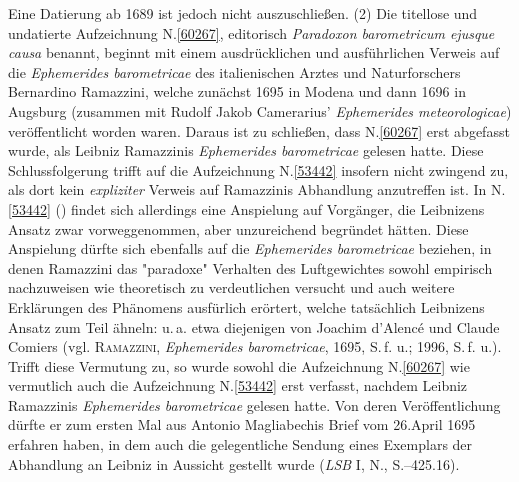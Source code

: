 Eine Datierung ab 1689 ist jedoch nicht auszuschließen.
\pend%
\pstart%
(2)
Die titellose und undatierte Aufzeichnung N.\;\ref{60267}, editorisch \textit{Paradoxon barometricum ejusque causa} benannt, beginnt mit einem ausdrücklichen und ausführlichen Verweis auf die \textit{Ephemerides barometricae} des italienischen Arztes und Naturforschers Bernardino Ramazzini, welche zunächst 1695\cite{01516} in Modena und dann 1696\cite{01517} in Augsburg (zusammen mit Rudolf Jakob Camerarius' \textit{Ephemerides meteorologicae})\cite{01445} veröffentlicht worden waren.
Daraus ist zu schließen, dass N.\;\ref{60267} erst abgefasst wurde, als Leibniz Ramazzinis \textit{Ephemerides barometricae}\cite{01516} gelesen hatte.
Diese Schlussfolgerung trifft auf die Aufzeichnung N.\;\ref{53442} insofern nicht zwingend zu, als dort kein \textit{expliziter} Verweis auf Ramazzinis Abhandlung anzutreffen ist.
In N.\;\ref{53442} () findet sich allerdings eine Anspielung auf Vorgänger, die Leibnizens Ansatz zwar vorweggenommen, aber unzureichend begründet hätten.
Diese Anspielung dürfte sich ebenfalls auf die \textit{Ephemerides barometricae} beziehen, in denen Ramazzini das "paradoxe" Verhalten des Luftgewichtes sowohl empirisch nachzuweisen wie theoretisch zu verdeutlichen versucht und auch weitere Erklärungen des Phänomens ausfürlich erörtert, welche tatsächlich Leibnizens Ansatz zum Teil ähneln: u.\,a. etwa diejenigen von Joachim d'Alencé und Claude Comiers (vgl. \textsc{Ramazzini}, \textit{Ephemerides barometricae}, 1695,\cite{01516} S.\,f. u.; 1996,\cite{01517} S.\,f. u.).
Trifft diese Vermutung zu, so %
wurde sowohl die Aufzeichnung N.\;\ref{60267} wie vermutlich auch die Aufzeichnung N.\;\ref{53442} erst verfasst, nachdem Leibniz Ramazzinis \textit{Ephemerides barometricae} gelesen hatte.\cite{01516}
Von deren Veröffentlichung dürfte er zum ersten Mal aus Antonio Magliabechis Brief vom 26.\;April 1695 erfahren haben, in dem auch die gelegentliche Sendung eines Exemplars der Abhandlung %
an Leibniz in Aussicht gestellt wurde (\textit{LSB} I, N., S.--425.16).\cite{01441}
